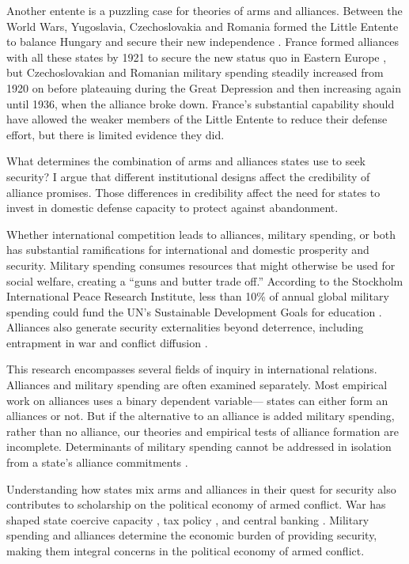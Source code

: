 \documentclass[12pt]{article}
\begin{document}
Another entente is a puzzling case for theories of arms and alliances. Between the World Wars, Yugoslavia, Czechoslovakia and Romania formed the Little Entente to balance Hungary and secure their new independence \citep{Benes1922, Osusky1934}. France formed alliances with all these states by 1921 to secure the new status quo in Eastern Europe \citep[pg. 142-3]{Crane1931}, but Czechoslovakian and Romanian military spending steadily increased from 1920 on before plateauing during the Great Depression and then increasing again until 1936, when the alliance broke down. France's substantial capability should have allowed the weaker members of the Little Entente to reduce their defense effort, but there is limited evidence they did. 

 

What determines the combination of arms and alliances states use to seek security? I argue that different institutional designs affect the credibility of alliance promises. Those differences in credibility affect the need for states to invest in domestic defense capacity to protect against abandonment. 
 
Whether international competition leads to alliances, military spending, or both has substantial ramifications for international and domestic prosperity and security. Military spending consumes resources that might otherwise be used for social welfare, creating a ``guns and butter trade off.'' According to the Stockholm International Peace Research Institute, less than 10\% of annual global military spending could fund the UN's Sustainable Development Goals for education \citep{SIPRI2016}. Alliances also generate security externalities beyond deterrence, including entrapment in war \citep{Snyder1984} and conflict diffusion \citep{MelinKoch2010}. 

This research encompasses several fields of inquiry in international relations. Alliances and military spending are often examined separately. Most empirical work on alliances uses a binary dependent variable--- states can either form an alliances or not. But if the alternative to an alliance is added military spending, rather than no alliance, our theories and empirical tests of alliance formation are incomplete. Determinants of military spending cannot be addressed in isolation from a state's alliance commitments \citep{Nordhausetal2012}.   

Understanding how states mix arms and alliances in their quest for security also contributes to scholarship on the political economy of armed conflict. War has shaped state coercive capacity \citep{Bean1973, Tilly1990}, tax policy \citep{Dinceccoetal2011, ScheveStasavage2012}, and central banking \citep{Poast2015}. Military spending and alliances determine the economic burden of providing security, making them integral concerns in the political economy of armed conflict.  
\end{document}
